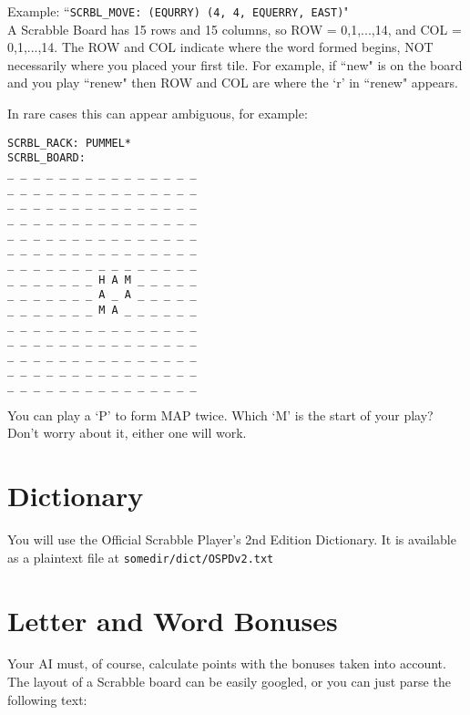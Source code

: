\documentclass{article}
\begin{document}
Example: ``\verb=SCRBL_MOVE: (EQURRY) (4, 4, EQUERRY, EAST)="
\\

A Scrabble Board has 15 rows and 15 columns, so ROW = 0,1,...,14, and COL = 0,1,...,14. The ROW and COL indicate where the word formed begins, NOT necessarily where you placed your first tile. For example, if ``new" is on the board and you play ``renew" then ROW and COL are where the `r' in ``renew" appears. 

In rare cases this can appear ambiguous, for example: 

\begin{verbatim}
SCRBL_RACK: PUMMEL*
SCRBL_BOARD:
_ _ _ _ _ _ _ _ _ _ _ _ _ _ _
_ _ _ _ _ _ _ _ _ _ _ _ _ _ _
_ _ _ _ _ _ _ _ _ _ _ _ _ _ _
_ _ _ _ _ _ _ _ _ _ _ _ _ _ _
_ _ _ _ _ _ _ _ _ _ _ _ _ _ _
_ _ _ _ _ _ _ _ _ _ _ _ _ _ _
_ _ _ _ _ _ _ _ _ _ _ _ _ _ _
_ _ _ _ _ _ _ H A M _ _ _ _ _
_ _ _ _ _ _ _ A _ A _ _ _ _ _
_ _ _ _ _ _ _ M A _ _ _ _ _ _
_ _ _ _ _ _ _ _ _ _ _ _ _ _ _
_ _ _ _ _ _ _ _ _ _ _ _ _ _ _
_ _ _ _ _ _ _ _ _ _ _ _ _ _ _
_ _ _ _ _ _ _ _ _ _ _ _ _ _ _
_ _ _ _ _ _ _ _ _ _ _ _ _ _ _
\end{verbatim}

You can play a `P' to form MAP twice. Which `M' is the start of your play? Don't worry about it, either one will work. 

\section{Dictionary}
You will use the Official Scrabble Player's 2nd Edition Dictionary. It is available as a plaintext file at \verb=somedir/dict/OSPDv2.txt=

\section{Letter and Word Bonuses}
Your AI must, of course, calculate points with the bonuses taken into account. The layout of a Scrabble board can be easily googled, or you can just parse the following text: 
\end{document}

